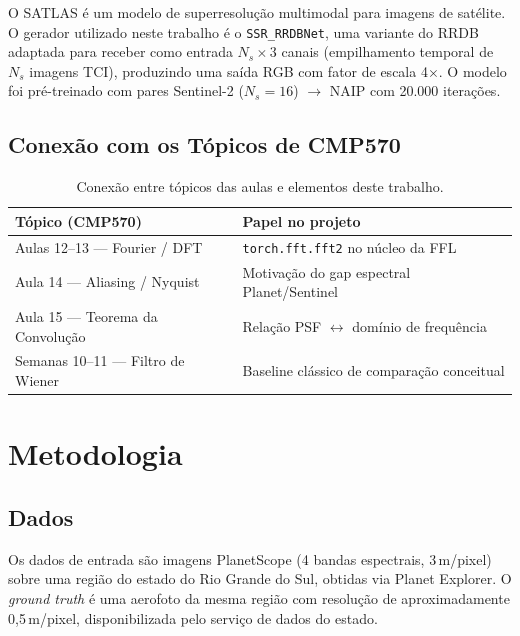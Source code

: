 \documentclass[12pt, a4paper]{article}
\begin{document}
O SATLAS é um modelo de superresolução multimodal para imagens de satélite.
O gerador utilizado neste trabalho é o \texttt{SSR\_RRDBNet}, uma variante do
RRDB~\cite{esrgan} adaptada para receber como entrada $N_s \times 3$ canais
(empilhamento temporal de $N_s$ imagens TCI), produzindo uma saída RGB com
fator de escala 4$\times$. O modelo foi pré-treinado com pares
Sentinel-2 ($N_s=16$) $\rightarrow$ NAIP com 20.000 iterações.

\subsection{Conexão com os Tópicos de CMP570}

\begin{table}[H]
\centering
\caption{Conexão entre tópicos das aulas e elementos deste trabalho.}
\label{tab:conexao}
\begin{tabular}{ll}
\toprule
\textbf{Tópico (CMP570)} & \textbf{Papel no projeto} \\
\midrule
Aulas 12--13 — Fourier / DFT & \texttt{torch.fft.fft2} no núcleo da FFL \\
Aula 14 — Aliasing / Nyquist & Motivação do gap espectral Planet/Sentinel \\
Aula 15 — Teorema da Convolução & Relação PSF $\leftrightarrow$ domínio de frequência \\
Semanas 10--11 — Filtro de Wiener & Baseline clássico de comparação conceitual \\
\bottomrule
\end{tabular}
\end{table}

\section{Metodologia}

\subsection{Dados}

Os dados de entrada são imagens PlanetScope (4 bandas espectrais, 3\,m/pixel)
sobre uma região do estado do Rio Grande do Sul, obtidas via Planet Explorer.
O \textit{ground truth} é uma aerofoto da mesma região com resolução de
aproximadamente 0{,}5\,m/pixel, disponibilizada pelo serviço de dados do estado.
\end{document}
